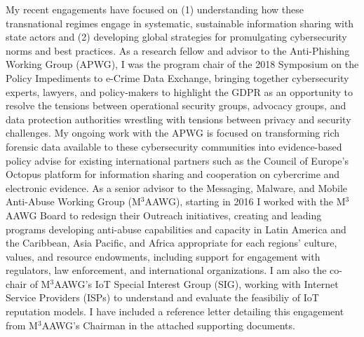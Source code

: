 \documentclass[11pt]{letter}
\begin{document}
\begin{letter}
My recent engagements have focused on (1) understanding how these transnational regimes engage in systematic, sustainable information sharing with state actors and (2) developing global strategies for promulgating cybersecurity norms and best practices.
%
%
%
As a research fellow and advisor to the Anti-Phishing Working Group (APWG), I was the program chair of the 2018 Symposium on the Policy Impediments to e-Crime Data Exchange, bringing together cybersecurity experts,
lawyers, and policy-makers to highlight the GDPR as an opportunity to resolve the tensions between operational security groups, advocacy groups, and data protection authorities wrestling with tensions between privacy and security challenges.
%
My ongoing work with the APWG is focused on transforming rich forensic data available to these cybersecurity communities into evidence-based policy advise for existing international partners such as the Council of Europe's Octopus platform for information sharing and cooperation on cybercrime and electronic evidence.
%
As a senior advisor to the Messaging, Malware, and Mobile Anti-Abuse Working Group (M$^3$AAWG), starting in 2016 I worked with the M$^3$AAWG Board to redesign their Outreach initiatives, creating and leading 
programs developing anti-abuse capabilities and capacity in Latin America and the Caribbean, Asia Pacific, and Africa appropriate for each regions' culture, values, and resource endowments, including support for engagement with regulators, law enforcement, and international organizations.
%
I am also the co-chair of M$^3$AAWG's IoT Special Interest Group (SIG), working with Internet Service Providers (ISPs) to understand and evaluate the feasibiliy of IoT reputation models.
%
I have included a reference letter detailing this engagement from M$^3$AAWG's Chairman in the attached supporting documents.


\end{letter}
\end{document}
